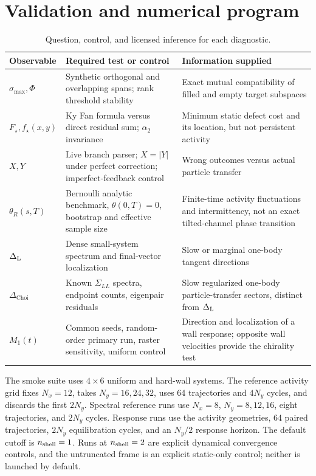 \documentclass[aps,prb,onecolumn,nofootinbib,superscriptaddress]{revtex4-2}
\begin{document}
\section{Validation and numerical program}

\begin{table}[ht]
\caption{Question, control, and licensed inference for each diagnostic.}
\begin{ruledtabular}
\begin{tabular}{p{}p{}p{}}
Observable & Required test or control & Information supplied \\
\midrule
$\sigma_{\max},\Phi$ & Synthetic orthogonal and overlapping spans; rank threshold stability & Exact mutual compatibility of filled and empty target subspaces \\
$F_\star,f_\star(x,y)$ & Ky Fan formula versus direct residual sum; $\alpha_2$ invariance & Minimum static defect cost and its location, but not persistent activity \\
$X,Y$ & Live branch parser; $X=|Y|$ under perfect correction; imperfect-feedback control & Wrong outcomes versus actual particle transfer \\
$\theta_R(s,T)$ & Bernoulli analytic benchmark, $\theta(0,T)=0$, bootstrap and effective sample size & Finite-time activity fluctuations and intermittency, not an exact tilted-channel phase transition \\
$\Delta_{\rm L}$ & Dense small-system spectrum and final-vector localization & Slow or marginal one-body tangent directions \\
$\Delta_{\mathrm{Choi}}$ & Known $\Sigma_{LL}$ spectra, endpoint counts, eigenpair residuals & Slow regularized one-body particle-transfer sectors, distinct from $\Delta_{\rm L}$ \\
$M_1(t)$ & Common seeds, random-order primary run, raster sensitivity, uniform control & Direction and localization of a wall response; opposite wall velocities provide the chirality test \\
\end{tabular}
\end{ruledtabular}
\end{table}

The smoke suite uses $4\times6$ uniform and hard-wall systems.  The reference
activity grid fixes $N_x=12$, takes $N_y=16,24,32$, uses 64 trajectories and
$4N_y$ cycles, and discards the first $2N_y$.  Spectral reference runs use
$N_x=8$, $N_y=8,12,16$, eight trajectories, and $2N_y$ cycles.  Response runs
use the activity geometries, 64 paired trajectories, $2N_y$ equilibration
cycles, and an $N_y/2$ response horizon.  The default cutoff is
$n_{\rm shell}=1$.  Runs at $n_{\rm shell}=2$ are explicit dynamical
convergence controls, and the untruncated frame is an explicit static-only
control; neither is launched by default.
\end{document}

